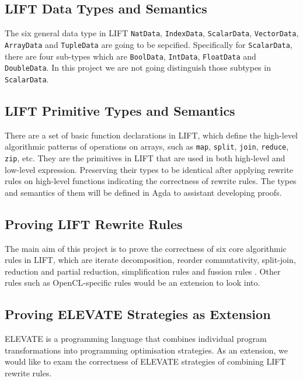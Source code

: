 \documentclass[]{article}
\begin{document}
\subsection{LIFT Data Types and Semantics}
The six general data type in LIFT \texttt{NatData}, \texttt{IndexData}, \texttt{ScalarData}, 
\texttt{VectorData}, \texttt{ArrayData} and \texttt{TupleData} are going to be sepcified. Specifically 
for \texttt{ScalarData}, there are four sub-types which are \texttt{BoolData}, \texttt{IntData}, 
\texttt{FloatData} and \texttt{DoubleData}. In this project we are not going distinguish those subtypes 
in \texttt{ScalarData}.

\subsection{LIFT Primitive Types and Semantics}
There are a set of basic function declarations in LIFT, which define the high-level algorithmic patterns 
of operations on arrays, such as \texttt{map}, \texttt{split}, \texttt{join}, \texttt{reduce}, \texttt{zip}, 
etc. \cite{atkeydata} They are the primitives in LIFT that are used in both high-level and low-level expression. Preserving 
their types to be identical after applying rewrite rules on high-level functions indicating the correctness 
of rewrite rules. The types and semantics of them will be defined in Agda to assistant developing proofs.

\subsection{Proving LIFT Rewrite Rules}
The main aim of this project is to prove the correctness of six core algorithmic rules in LIFT, which are 
iterate decomposition, reorder commutativity, split-join, reduction and partial reduction, simplification 
rules and fussion rules \cite{steuwer2015patterns}. Other rules such as OpenCL-specific rules would be an extension to look into.

\subsection{Proving ELEVATE Strategies as Extension}
ELEVATE is a programming language that combines individual program transformations into programming 
optimisation strategies. As an extension, we would like to exam the correctness of ELEVATE strategies 
of combining LIFT rewrite rules.
\end{document}
